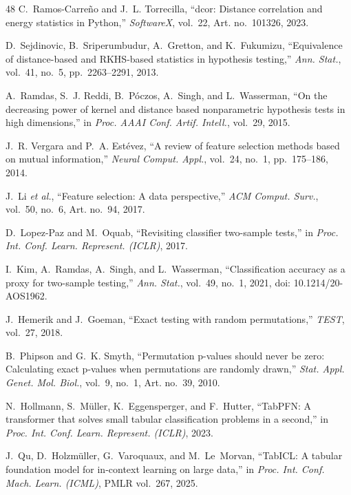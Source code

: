 \begin{thebibliography}{48}
C.~Ramos-Carre\~{n}o and J.~L. Torrecilla, ``dcor: Distance correlation and energy statistics in Python,'' \emph{SoftwareX}, vol.~22, Art. no.~101326, 2023.

D.~Sejdinovic, B.~Sriperumbudur, A.~Gretton, and K.~Fukumizu, ``Equivalence of distance-based and RKHS-based statistics in hypothesis testing,'' \emph{Ann. Stat.}, vol.~41, no.~5, pp.~2263--2291, 2013.

A.~Ramdas, S.~J. Reddi, B.~P\'{o}czos, A.~Singh, and L.~Wasserman, ``On the decreasing power of kernel and distance based nonparametric hypothesis tests in high dimensions,'' in \emph{Proc. AAAI Conf. Artif. Intell.}, vol.~29, 2015.

J.~R. Vergara and P.~A. Est\'{e}vez, ``A review of feature selection methods based on mutual information,'' \emph{Neural Comput. Appl.}, vol.~24, no.~1, pp.~175--186, 2014.

J.~Li \emph{et al.}, ``Feature selection: A data perspective,'' \emph{ACM Comput. Surv.}, vol.~50, no.~6, Art. no.~94, 2017.

D.~Lopez-Paz and M.~Oquab, ``Revisiting classifier two-sample tests,'' in \emph{Proc. Int. Conf. Learn. Represent. (ICLR)}, 2017.

I.~Kim, A.~Ramdas, A.~Singh, and L.~Wasserman, ``Classification accuracy as a proxy for two-sample testing,'' \emph{Ann. Stat.}, vol.~49, no.~1, 2021, doi: 10.1214/20-AOS1962.

J.~Hemerik and J.~Goeman, ``Exact testing with random permutations,'' \emph{TEST}, vol.~27, 2018.

B.~Phipson and G.~K. Smyth, ``Permutation p-values should never be zero: Calculating exact p-values when permutations are randomly drawn,'' \emph{Stat. Appl. Genet. Mol. Biol.}, vol.~9, no.~1, Art. no.~39, 2010.

N.~Hollmann, S.~M{\"u}ller, K.~Eggensperger, and F.~Hutter, ``TabPFN: A transformer that solves small tabular classification problems in a second,'' in \emph{Proc. Int. Conf. Learn. Represent. (ICLR)}, 2023.

J.~Qu, D.~Holzm{\"u}ller, G.~Varoquaux, and M.~Le~Morvan, ``TabICL: A tabular foundation model for in-context learning on large data,'' in \emph{Proc. Int. Conf. Mach. Learn. (ICML)}, PMLR vol.~267, 2025.


\end{thebibliography}
